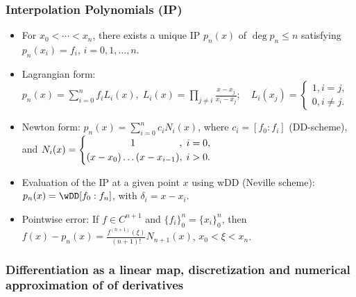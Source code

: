 \documentclass[a4paper]{article}
\begin{document}

\subsubsection*{Interpolation Polynomials (IP)} %
\begin{itemize}

  \item For $x_0<\cdots<x_n$,
    there exists a unique IP $p_n(x)$ of $\deg p_n \le n$
    satisfying $p_n(x_i)=f_i$,
    $i=0,1,\ldots,n$.

  \item Lagrangian form:
      \(
      \displaystyle
        p_n(x) = \sum_{i=0}^{n} f_iL_i(x), \;
        L_i(x) = \prod_{j\neq i}\frac{x-x_j}{x_i-x_j};
        \quad L_i(x_j) =
        \begin{cases}
          1, i=j, \\
          0, i\neq j.
        \end{cases}
      \)

 \item Newton form:
    $
    \displaystyle
      p_n(x) = \sum_{i=0}^{n} c_iN_i(x)
    $,
    where
    $
    c_i = {[f_0\!:\!f_i]}
    $
    (DD-scheme),
    and
    $
    N_i(x) =
    \begin{cases}
      \hfill1\hfill,\; i=0, \\
      (x-x_0)\ldots(x-x_{i-1}),\; i>0.
    \end{cases}
    $

    \item Evaluation of the IP at a given point $x$ using wDD (Neville scheme):
      $p_n(x)=\wDD[f_0:f_n]$, with $\delta_i=x-x_i$.

    \item Pointwise error:
    If $f\in C^{n+1}$ and $\{f_i\}_0^n=\{x_i\}_0^n$,
      then \/
    $
      f(x)-p_n(x)
    = \frac{f^{(n+1)}(\xi)}{(n+1)!}N_{n+1}(x)
    $,
    $x_0<\xi<x_n$.


\end{itemize}

\subsubsection*{Differentiation as a linear map, discretization  and numerical approximation of of derivatives}%
\end{document}
